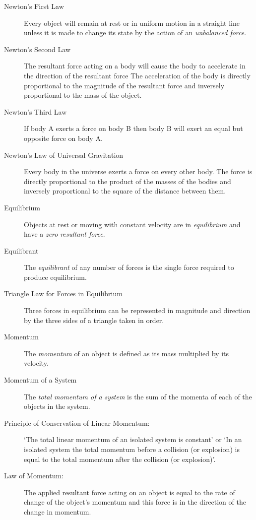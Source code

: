 \begin{description}
\item[Newton's First Law] Every object will remain at rest or in
uniform motion in a straight line unless it is made to change its
state by the action of an \emph{unbalanced force}.
\item[Newton's Second Law] The resultant force acting on a body
will cause the body to accelerate in the direction of the
resultant force The acceleration of the body is directly proportional to the magnitude of
the resultant force and inversely proportional to the mass of the object.
\item[Newton's Third Law] If body A exerts a force on body B then body B
will exert an equal but opposite force on body A.
\item[Newton's Law of Universal Gravitation] Every body in the universe exerts a force on every other body. The force is directly proportional to the product of the masses of the bodies and inversely proportional to the square of the distance between them.
\item[Equilibrium] Objects at rest or moving with constant velocity
are in {\em equilibrium} and have a {\em zero} {\em resultant force}.
\item[Equilibrant] The {\em equilibrant} of any number of forces is
the single force required to produce equilibrium.
\item[Triangle Law for Forces in Equilibrium] Three forces in
equilibrium can be represented in magnitude and direction by the
three sides of a triangle taken in order.
\item[Momentum] The {\em momentum} of an object is defined as its
mass multiplied by its velocity.
\item[Momentum of a System] The {\em total momentum of a system}
is the sum of the momenta of each of the objects in the system.
\item[Principle of Conservation of Linear Momentum:] `The total linear
momentum of an isolated system is constant' or `In an isolated
system the total momentum before a collision (or explosion) is equal
to the total momentum after the collision (or explosion)'.
\item[Law of Momentum:] The applied resultant force acting on an
object is equal to the rate of change of the object's momentum and
this force is in the direction of the change in momentum.
\end{description}


